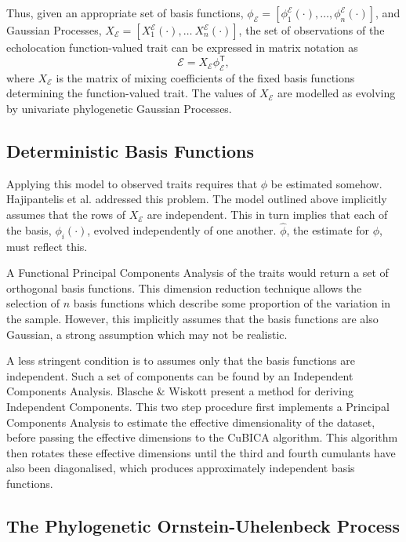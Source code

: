 \documentclass[wsdraft]{ws-rv9x6} %
\begin{document}
Thus, given an appropriate set of basis functions, \(\phi_{\mathcal{E}} = [\phi^{\mathcal{E}}_1(\cdot), \dots, \phi^{\mathcal{E}}_n(\cdot)]\), and Gaussian Processes, \(X_{\mathcal{E}} = [X_1^{\mathcal{E}}(\cdot), \dots\ X_n^{\mathcal{E}}(\cdot)]\), the set of observations of the echolocation function-valued trait can be expressed in matrix notation as 
\[
\mathcal{E} = X_{\mathcal{E}} \phi_{\mathcal{E}}^{\mathsf{T}},
\]
where \( X_{\mathcal{E}}\) is the matrix of mixing coefficients of the fixed basis functions determining the function-valued trait. The values of \( X_{\mathcal{E}}\) are modelled as evolving by univariate phylogenetic Gaussian Processes.

\subsection{Deterministic Basis Functions}

Applying this model to observed traits requires that \(\phi\) be estimated somehow. Hajipantelis et al. \cite{hadjipantelis2013function} addressed this problem. The model outlined above implicitly assumes that the rows of \(X_{\mathcal{E}}\) are independent. This in turn implies that each of the basis, \(\phi_i(\cdot)\), evolved independently of one another. \(\hat{\phi}\), the estimate for \(\phi\), must reflect this. 

A Functional Principal Components Analysis \cite{ramsay2006functional} of the traits would return a set of orthogonal basis functions. This dimension reduction technique allows the selection of \(n\) basis functions which describe some proportion of the variation in the sample. However, this implicitly assumes that the basis functions are also Gaussian, a strong assumption which may not be realistic.

A less stringent condition is to assumes only that the basis functions are independent. Such a set of components can be found by an Independent Components Analysis. Blasche \& Wiskott\cite{blaschke2004cubica} present a method for deriving Independent Components. This two step procedure first implements a Principal Components Analysis to estimate the effective dimensionality of the dataset, before passing the effective dimensions to the CuBICA algorithm. This algorithm then rotates these effective dimensions until the third and fourth cumulants have also been diagonalised, which produces approximately independent basis functions.

\subsection{The Phylogenetic Ornstein-Uhelenbeck Process}




\end{document}

